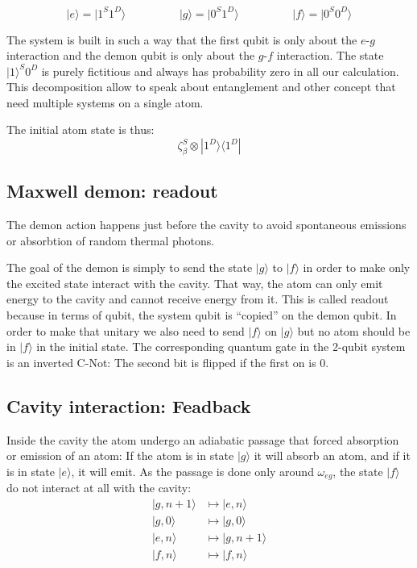 \documentclass[10pt]{report}
\theoremstyle{plain}
\theoremstyle{definition}
\theoremstyle{remark}
\newcommand{\ket}[1]{|#1\rangle}
\newcommand{\bra}[1]{\langle#1|}
\begin{document}
\[\ket e = \ket {1^S1^D} \hspace{2cm} \ket g = \ket{0^S1^D} \hspace{2cm} \ket f
  = \ket{0^S0^D}\]

The system is built in such a way that the first qubit is only about the $e$-$g$
interaction and the demon qubit is only about the $g$-$f$ interaction. The state
$\ket 1^S0^D$ is purely fictitious and always has probability zero in all our
calculation. This decomposition allow to speak about entanglement and other
concept that need multiple systems on a single atom.

The initial atom state is thus:
\[\zeta_\beta^S \otimes \ket {1^D} \bra {1^D}\]

\subsection{Maxwell demon: readout}

The demon action happens just before the cavity to avoid spontaneous emissions or
absorbtion of random thermal photons.

The goal of the demon is simply to send the state $\ket g$ to $\ket f$ in order
to make only the excited state interact with the cavity. That way, the atom can
only emit energy to the cavity and cannot receive energy from it. This is called
readout because in terms of qubit, the system qubit is ``copied'' on the demon
qubit. In order to make that unitary we also need to send $\ket f$ on $\ket g$
but no atom should be in $\ket f$ in the initial state. The corresponding quantum
gate in the 2-qubit system is an inverted C-Not: The second bit is flipped if
the first on is 0.

\subsection{Cavity interaction: Feadback}

Inside the cavity the atom undergo an adiabatic passage that forced absorption
or emission of an atom: If the atom is in state $\ket g$ it will absorb an atom,
and if it is in state $\ket e$, it will emit. As the passage is done only around
$\omega_{eg}$, the state $\ket f$ do not interact at all with the cavity:
\begin{align*}
  \ket{g,n+1} &\mapsto \ket{e,n}\\
  \ket{g,0} &\mapsto \ket{g,0}\\
  \ket{e,n} &\mapsto \ket{g,n+1}\\
  \ket{f,n} &\mapsto \ket{f,n}\\
\end{align*}
\end{document}
